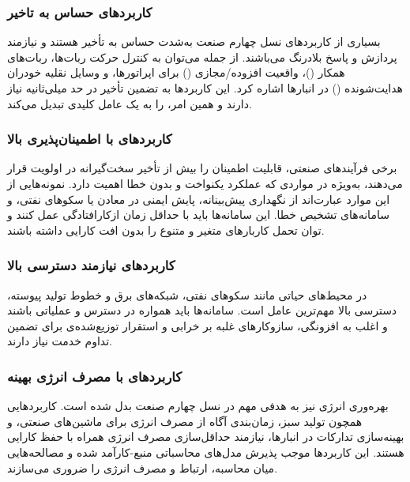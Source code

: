 \subsubsection{کاربردهای حساس به تاخیر}
بسیاری از کاربردهای نسل چهارم صنعت به‌شدت حساس به تأخیر هستند و نیازمند پردازش و پاسخ بلادرنگ می‌باشند. از جمله می‌توان به کنترل حرکت ربات‌ها، ربات‌های همکار ()، واقعیت افزوده/مجازی () برای اپراتورها، و وسایل نقلیه خودران هدایت‌شونده () در انبارها اشاره کرد. این کاربردها به تضمین تأخیر در حد میلی‌ثانیه نیاز دارند و همین امر،  را به یک عامل کلیدی تبدیل می‌کند.

\subsubsection{کاربردهای با اطمینان‌پذیری بالا}
برخی فرآیندهای صنعتی، قابلیت اطمینان را بیش از تأخیر سخت‌گیرانه در اولویت قرار می‌دهند، به‌ویژه در مواردی که عملکرد یکنواخت و بدون خطا اهمیت دارد. نمونه‌هایی از این موارد عبارت‌اند از نگهداری پیش‌بینانه، پایش ایمنی در معادن یا سکوهای نفتی، و سامانه‌های تشخیص خطا. این سامانه‌ها باید با حداقل زمان ازکارافتادگی عمل کنند و توان تحمل کاربارهای متغیر و متنوع را بدون افت کارایی داشته باشند.

\subsubsection{کاربردهای نیازمند دسترسی بالا}
در محیط‌های حیاتی مانند سکوهای نفتی، شبکه‌های برق و خطوط تولید پیوسته، دسترسی بالا مهم‌ترین عامل است. سامانه‌ها باید همواره در دسترس و عملیاتی باشند و اغلب به افزونگی، سازوکارهای غلبه بر خرابی  و استقرار توزیع‌شده‌ی  برای تضمین تداوم خدمت نیاز دارند.

\subsubsection{کاربردهای با مصرف انرژی بهینه}
بهره‌وری انرژی نیز به هدفی مهم در نسل چهارم صنعت بدل شده است. کاربردهایی همچون تولید سبز، زمان‌بندی ‌آگاه از مصرف انرژی برای ماشین‌های صنعتی، و بهینه‌سازی تدارکات در انبارها، نیازمند حداقل‌سازی مصرف انرژی همراه با حفظ کارایی هستند. این کاربردها موجب پذیرش مدل‌های محاسباتی منبع-کارآمد شده و مصالحه‌هایی میان محاسبه، ارتباط و مصرف انرژی را ضروری می‌سازند.

